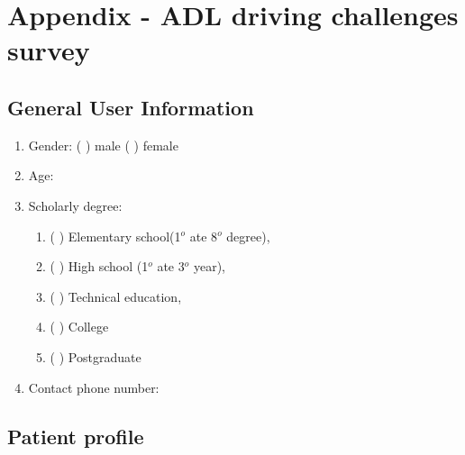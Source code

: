 \chapter{Appendix - ADL driving challenges survey}
\label{sec:adlChallenges}

\section{General User Information}

\begin{enumerate}
\item Gender: ( ) male ( ) female
\item Age: 
\item Scholarly degree:
\begin{enumerate}[label=(\alph*)]
\item (    ) Elementary school(1$^{o}$ ate 8$^{o}$  degree),
\item (    ) High school (1$^{o}$  ate 3$^{o}$  year),
\item (    ) Technical education,
\item (    ) College
\item (    ) Postgraduate
\end{enumerate}
\item  Contact phone number:
\end{enumerate}

\section{Patient profile}

